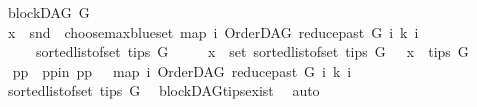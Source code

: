 \begin{isabellebody}
\ \ \ {\isachardoublequoteopen}blockDAG\ G{\isachardoublequoteclose}\isanewline
\ \ \ {\isachardoublequoteopen}x\ {\isacharequal}{\kern0pt}\ snd\ {\isacharparenleft}{\kern0pt}\ choose{\isacharunderscore}{\kern0pt}max{\isacharunderscore}{\kern0pt}blue{\isacharunderscore}{\kern0pt}set\ {\isacharparenleft}{\kern0pt}map\ {\isacharparenleft}{\kern0pt}{\isasymlambda}i{\isachardot}{\kern0pt}\ {\isacharparenleft}{\kern0pt}OrderDAG\ {\isacharparenleft}{\kern0pt}reduce{\isacharunderscore}{\kern0pt}past\ G\ i{\isacharparenright}{\kern0pt}\ k{\isacharcomma}{\kern0pt}\ i{\isacharparenright}{\kern0pt}{\isacharparenright}{\kern0pt}\isanewline
\ \ \ \ \ \ \ {\isacharparenleft}{\kern0pt}sorted{\isacharunderscore}{\kern0pt}list{\isacharunderscore}{\kern0pt}of{\isacharunderscore}{\kern0pt}set\ {\isacharparenleft}{\kern0pt}tips\ G{\isacharparenright}{\kern0pt}{\isacharparenright}{\kern0pt}{\isacharparenright}{\kern0pt}{\isacharparenright}{\kern0pt}{\isachardoublequoteclose}\ \isanewline
\ \ \ \ {\isachardoublequoteopen}x\ {\isasymin}\ set\ {\isacharparenleft}{\kern0pt}sorted{\isacharunderscore}{\kern0pt}list{\isacharunderscore}{\kern0pt}of{\isacharunderscore}{\kern0pt}set\ {\isacharparenleft}{\kern0pt}tips\ G{\isacharparenright}{\kern0pt}{\isacharparenright}{\kern0pt}{\isachardoublequoteclose}\ \ {\isachardoublequoteopen}\ x\ {\isasymin}\ tips\ G{\isachardoublequoteclose}\isanewline
%
\isadelimproof
%
\endisadelimproof
%
\isatagproof
{}\isamarkupfalse%
\ {\isacharminus}{\kern0pt}\ \isanewline
\ \ \isamarkupfalse%
\ pp\ \ pp{\isacharunderscore}{\kern0pt}in{\isacharcolon}{\kern0pt}\ {\isachardoublequoteopen}pp\ {\isacharequal}{\kern0pt}\ \ {\isacharparenleft}{\kern0pt}map\ {\isacharparenleft}{\kern0pt}{\isasymlambda}i{\isachardot}{\kern0pt}\ {\isacharparenleft}{\kern0pt}OrderDAG\ {\isacharparenleft}{\kern0pt}reduce{\isacharunderscore}{\kern0pt}past\ G\ i{\isacharparenright}{\kern0pt}\ k{\isacharcomma}{\kern0pt}\ i{\isacharparenright}{\kern0pt}{\isacharparenright}{\kern0pt}\isanewline
\ \ \ {\isacharparenleft}{\kern0pt}sorted{\isacharunderscore}{\kern0pt}list{\isacharunderscore}{\kern0pt}of{\isacharunderscore}{\kern0pt}set\ {\isacharparenleft}{\kern0pt}tips\ G{\isacharparenright}{\kern0pt}{\isacharparenright}{\kern0pt}{\isacharparenright}{\kern0pt}{\isachardoublequoteclose}\ \isamarkupfalse%
\ blockDAG{\isachardot}{\kern0pt}tips{\isacharunderscore}{\kern0pt}exist\ \isamarkupfalse%
\ auto\isanewline
\ \ \ \ \isamarkupfalse%

\end{isabellebody}
